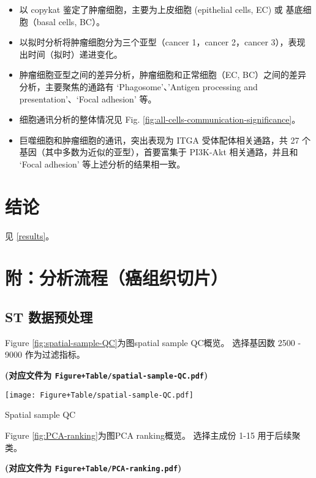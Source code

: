 \documentclass[
]{article}
\providecommand{\tightlist}{%
  \setlength{\itemsep}{0pt}\setlength{\parskip}{0pt}}
\begin{document}
\begin{itemize}
\tightlist
\item
  以 copykat 鉴定了肿瘤细胞，主要为上皮细胞 (epithelial cells, EC) 或 基底细胞（basal cells, BC）。
\item
  以拟时分析将肿瘤细胞分为三个亚型（cancer 1，cancer 2，cancer 3），表现出时间（拟时）递进变化。
\item
  肿瘤细胞亚型之间的差异分析，肿瘤细胞和正常细胞（EC, BC）之间的差异分析，主要聚焦的通路有 `Phagosome'、'Antigen processing and presentation'、`Focal adhesion' 等。
\item
  细胞通讯分析的整体情况见 Fig. \ref{fig:all-cells-communication-significance}。
\item
  巨噬细胞和肿瘤细胞的通讯，突出表现为 ITGA 受体配体相关通路，共 27 个基因（其中多数为近似的亚型），首要富集于 PI3K-Akt 相关通路，并且和 `Focal adhesion' 等上述分析的结果相一致。
\end{itemize}

\hypertarget{dis}{%
\section{结论}\label{dis}}

见 \ref{results}。

\hypertarget{workflow1}{%
\section{附：分析流程（癌组织切片）}\label{workflow1}}

\hypertarget{st-ux6570ux636eux9884ux5904ux7406}{%
\subsection{ST 数据预处理}\label{st-ux6570ux636eux9884ux5904ux7406}}

Figure \ref{fig:spatial-sample-QC}为图spatial sample QC概览。
选择基因数 2500 - 9000 作为过滤指标。

\textbf{(对应文件为 \texttt{Figure+Table/spatial-sample-QC.pdf})}

\def\@captype{figure}
\begin{center}
\texttt{[image: Figure+Table/spatial-sample-QC.pdf]}
\caption{Spatial sample QC}\label{fig:spatial-sample-QC}
\end{center}

Figure \ref{fig:PCA-ranking}为图PCA ranking概览。
选择主成份 1-15 用于后续聚类。

\textbf{(对应文件为 \texttt{Figure+Table/PCA-ranking.pdf})}
\end{document}
